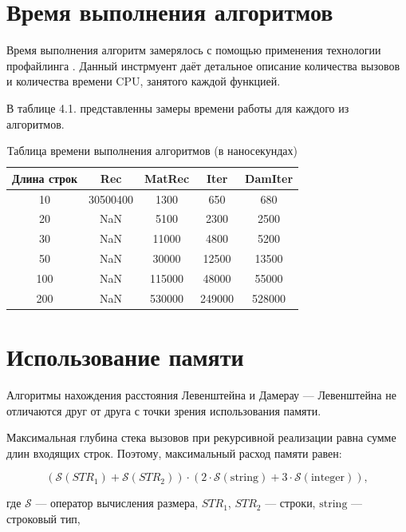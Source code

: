 \documentclass[12pt]{report}
\begin{document}
\section{Время выполнения алгоритмов}
Время выполнения алгоритм замерялось с помощью применения технологии профайлинга \cite{profiling}. Данный инстрмуент даёт детальное описание количества вызовов и количества времени CPU, занятого каждой функцией. \newline

В таблице 4.1. представленны замеры времени работы для каждого из алгоритмов.

\begin{table} [h!]
	\caption{Таблица времени выполнения алгоритмов (в наносекундах)}
	\begin{center}
		\begin{tabular}{|c c c c c|} 
		 	\hline
			Длина строк & Rec & MatRec & Iter & DamIter \\  
		 	\hline
		 	10 & 30500400 & 1300 & 650 & 680\\
		 	\hline
		 	20 & NaN & 5100 & 2300 & 2500 \\
		 	\hline
			30 & NaN & 11000 & 4800 & 5200 \\
			\hline
			50 & NaN & 30000 & 12500 & 13500 \\
			\hline
			100 & NaN & 115000 & 48000 & 55000\\
			\hline
			200 & NaN & 530000 & 249000 & 528000 \\
			\hline
		\end{tabular}
	\end{center}
\end{table}

\section{Использование памяти}

Алгоритмы нахождения расстояния Левенштейна и Дамерау — Левенштейна не отличаются друг от друга с точки зрения использования памяти.

Максимальная глубина стека вызовов при рекурсивной реализации равна сумме длин входящих строк. Поэтому, максимальный расход памяти равен: 

\begin{equation}
(\mathcal{S}(STR_1) + \mathcal{S}(STR_2)) \cdot (2 \cdot \mathcal{S}\mathrm{(string)} + 3 \cdot \mathcal{S}\mathrm{(integer)}),
\end{equation}

\noindent где $\mathcal{S}$ — оператор вычисления размера, $STR_1$, $STR_2$ — строки, $\mathrm{string}$ — строковый тип, 
\end{document}
